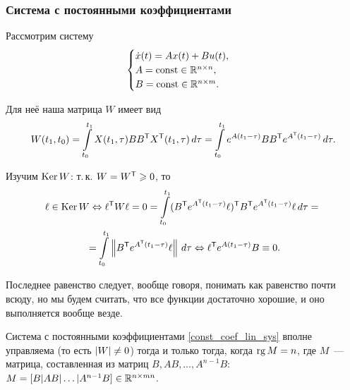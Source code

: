 \subsubsection{Система с постоянными коэффициентами}

Рассмотрим систему
\begin{equation}
\label{const_coef_lin_sys}
  \begin{cases}
    \dot{x}(t) = A x(t) + B u(t),\\
    A = \operatorname{const} \in \mathbb{R}^{n \times n},\\
    B = \operatorname{const} \in \mathbb{R}^{n \times m}.
  \end{cases}
\end{equation}

Для неё наша матрица $W$ имеет вид
\begin{equation*}
	W(t_1, t_0) = \int\limits_{t_0}^{t_1} X(t_1, \tau) B B^{\mathsf{T}} X^{\mathsf{T}}(t_1, \tau) \, d\tau =
	\int\limits_{t_0}^{t_1} e^{A(t_1 - \tau)} B B^{\mathsf{T}} e^{A^{\mathsf{T}}(t_1 - \tau)} \, d\tau.
\end{equation*}

Изучим $\operatorname{Ker} W$: т.\,к. $W = W^{\mathsf{T}} \geqslant 0$, то
\begin{gather*}
	\ell \in \operatorname{Ker} W \Leftrightarrow
	\ell^{\mathsf{T}} W \ell = 0 =
	\int\limits_{t_0}^{t_1}
	  (B^{\mathsf{T}} e^{A^{\mathsf{T}}(t_1 - \tau)} \ell)^{\mathsf{T}} B^{\mathsf{T}} e^{A^{\mathsf{T}}(t_1 - \tau)} \ell \, d\tau ={}\\
	{}= \int\limits_{t_0}^{t_1} \left\| B^{\mathsf{T}} e^{A^{\mathsf{T}}(t_1 - \tau)} \ell \right\| \, d\tau
	\Leftrightarrow \ell^{\mathsf{T}} e^{A(t_1 - \tau)} B \equiv 0.
\end{gather*}
	
Последнее равенство следует, вообще говоря, понимать как равенство почти всюду,
но мы будем считать, что все функции достаточно хорошие,
и оно выполняется вообще везде.

\begin{stm}
  Система с постоянными коэффициентами \eqref{const_coef_lin_sys} вполне управляема (то есть $\left| W \right| \neq 0$)
  тогда и только тогда, когда $\operatorname{rg} M = n$,
  где $M$~--- матрица,
  составленная из матриц $B, AB, \ldots, A^{n - 1} B$:
  $M = [B | AB | \ldots | A^{n - 1} B] \in \mathbb R^{n \times m n}$.
\end{stm}

